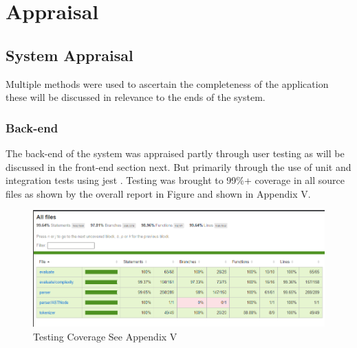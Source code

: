 \newpage
\section{Appraisal}
\subsection{System Appraisal}
Multiple methods were used to ascertain the completeness of the application these will be discussed in 
relevance to the ends of the system.
\subsubsection{Back-end}
The back-end of the system was appraised partly through user testing as will be discussed in the 
front-end section next. But primarily through the use of unit and integration tests using jest \cite{jest}.
Testing was brought to 99\%+ coverage in all source files as shown by the overall report in Figure  and 
shown in Appendix V.
\begin{figure}[h]
    \includegraphics[width=.5\textwidth]{images/coverage.png}
    \caption{Testing Coverage See Appendix V}
    \label{fig:coverage}
\end{figure}

